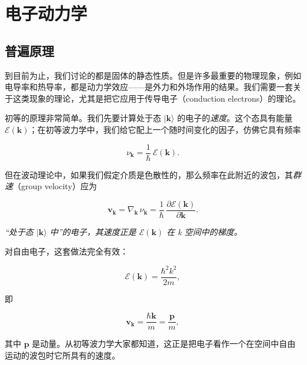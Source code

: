 
\chapter{电子动力学}


\section{普遍原理}

到目前为止，我们讨论的都是固体的静态性质。但是许多最重要的物理现象，例如电导率和热导率，都是动力学效应——是外力和外场作用的结果。我们需要一套关于这类现象的理论，尤其是把它应用于传导电子（conduction electrons）的理论。

初等的原理非常简单。我们先要计算处于态 $|\mathbf{k}\rangle$ 的电子的\emph{速度}。这个态具有能量 $\mathcal{E}(\mathbf{k})$；在初等波力学中，我们给它配上一个随时间变化的因子，仿佛它具有频率

\begin{equation*}
\nu_{\mathbf{k}} = \frac{1}{\hbar}\,\mathcal{E}(\mathbf{k}).
\tag{6.1}
\end{equation*}

但在波动理论中，如果我们假定介质是色散性的，那么频率在此附近的波包，其\emph{群速}（group velocity）应为

\begin{equation*}
\mathbf{v}_{\mathbf{k}} = \nabla_{\mathbf{k}}\,\nu_{\mathbf{k}} = \frac{1}{\hbar}\,\frac{\partial\mathcal{E}(\mathbf{k})}{\partial\mathbf{k}}.
\tag{6.2}
\end{equation*}

\emph{“处于态 $|\mathbf{k}\rangle$ 中”的电子，其速度正是 $\mathcal{E}(\mathbf{k})$ 在 k 空间中的梯度。}

对自由电子，这套做法完全有效：

\begin{equation*}
\mathcal{E}(\mathbf{k}) = \frac{\hbar^2 k^2}{2m},
\tag{6.3}
\end{equation*}

即

\begin{equation*}
\mathbf{v}_{\mathbf{k}} = \frac{\hbar\mathbf{k}}{m} = \frac{\mathbf{p}}{m},
\tag{6.4}
\end{equation*}

其中 $\mathbf{p}$ 是动量。从初等波力学大家都知道，这正是把电子看作一个在空间中自由运动的波包时它所具有的速度。


